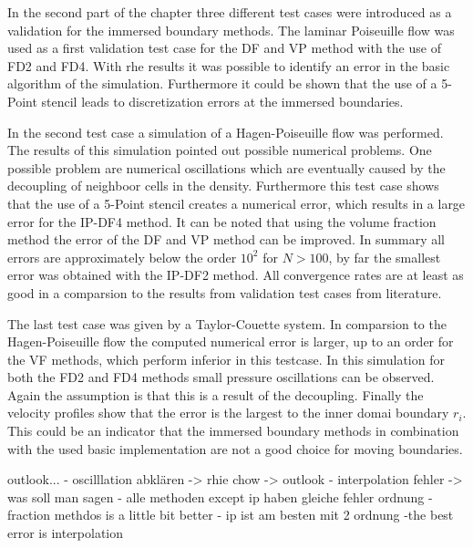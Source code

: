 In the second part of the chapter three different test cases were introduced as a validation for the immersed boundary methods.
The laminar Poiseuille flow was used as a first validation test case for the DF and VP method with the use of FD2 and FD4.
With rhe results it was possible to identify an error in the basic algorithm of the simulation.
Furthermore it could be shown that the use of a 5-Point stencil leads to discretization errors at the immersed boundaries.

In the second test case a simulation of a Hagen-Poiseuille flow was performed.
The results of this simulation pointed out possible numerical problems.
One possible problem are numerical oscillations which are eventually caused
by the decoupling of neighboor cells in the density.
Furthermore this test case shows that the use of a 5-Point stencil creates a numerical error,
which results in a large error for the IP-DF4 method.
It can be noted that using the volume fraction method  the error of the DF and VP method can be improved.
In summary all errors are approximately below the order  $10^2$ for $N>100$,
by far the smallest error was obtained with the IP-DF2 method.
All convergence rates are at least as good in a comparsion
to the results from validation test cases from literature.

The last test case was given by a Taylor-Couette system.
In comparsion to the Hagen-Poiseuille flow the  computed numerical error is larger,
up to an order for the VF methods, which perform inferior in this testcase.
In this simulation for both the FD2 and FD4 methods small pressure oscillations can be observed.
Again the assumption is that this is a result of the decoupling.
Finally the velocity profiles show that the error is the largest to the inner domai boundary $r_i$.
This could be an indicator that the immersed boundary methods in combination with the used basic implementation
are not a good choice for moving boundaries.

outlook...
- oscilllation abklären -> rhie chow -> outlook
- interpolation fehler -> was soll man sagen
- alle methoden except ip haben gleiche fehler ordnung
- fraction methdos is a little bit better
- ip ist am besten mit 2 ordnung
-the best error is interpolation



